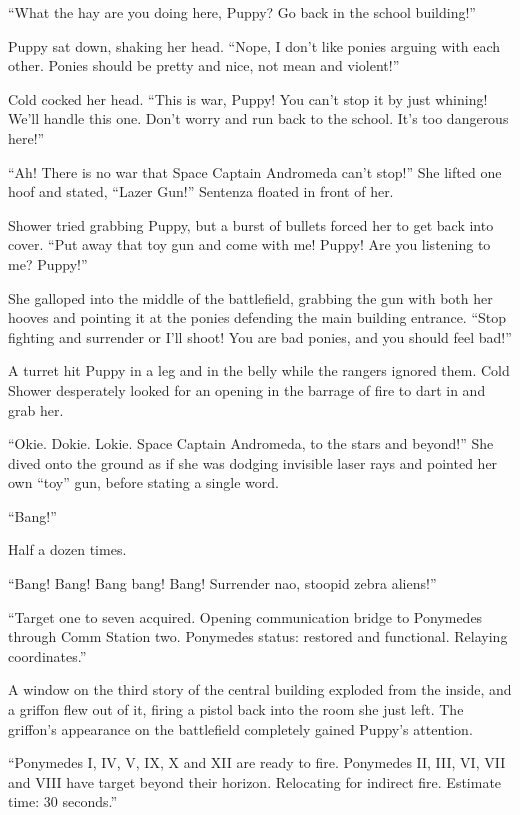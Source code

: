 ``What the hay are you doing here, Puppy? Go back in the school building!''

Puppy sat down, shaking her head. ``Nope, I don't like ponies arguing with each other. Ponies should be pretty and nice, not mean and violent!''

Cold cocked her head. ``This is war, Puppy! You can't stop it by just whining! We'll handle this one. Don't worry and run back to the school. It's too dangerous here!''

``Ah! There is no war that Space Captain Andromeda can't stop!'' She lifted one hoof and stated, ``Lazer Gun!'' Sentenza floated in front of her.

Shower tried grabbing Puppy, but a burst of bullets forced her to get back into cover. ``Put away that toy gun and come with me! Puppy! Are you listening to me? Puppy!''

She galloped into the middle of the battlefield, grabbing the gun with both her hooves and pointing it at the ponies defending the main building entrance. ``Stop fighting and surrender or I'll shoot! You are bad ponies, and you should feel bad!''

A turret hit Puppy in a leg and in the belly while the rangers ignored them. Cold Shower desperately looked for an opening in the barrage of fire to dart in and grab her.

``Okie. Dokie. Lokie. Space Captain Andromeda, to the stars and beyond!'' She dived onto the ground as if she was dodging invisible laser rays and pointed her own ``toy'' gun, before stating a single word.

``Bang!''

Half a dozen times.

``Bang! Bang! Bang bang! Bang! Surrender nao, stoopid zebra aliens!''

{\mten ``Target one to seven acquired. Opening communication bridge to Ponymedes through Comm Station two. Ponymedes status: restored and functional. Relaying coordinates.''}

A window on the third story of the central building exploded from the inside, and a griffon flew out of it, firing a pistol back into the room she just left. The griffon's appearance on the battlefield completely gained Puppy's attention.

{\mten ``Ponymedes I, IV, V, IX, X and XII are ready to fire. Ponymedes II, III, VI, VII and VIII have target beyond their horizon. Relocating for indirect fire. Estimate time: 30 seconds.''}

